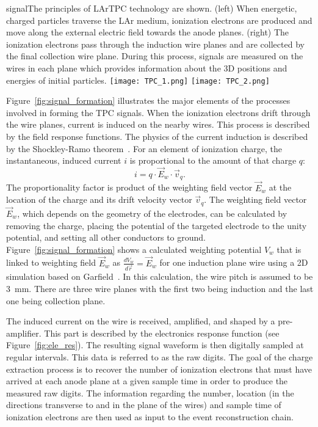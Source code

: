 \begin{cdrfigure}{signal}{The principles of LArTPC technology are shown. (left) When energetic, charged particles 
traverse the LAr medium, ionization electrons are produced and move
along the external electric field towards the anode planes. (right) The ionization
electrons pass through the induction wire planes and are  collected by the 
final collection wire plane. 
During this process, signals are measured on the wires
in each plane which provides information about the 3D positions and
energies of initial particles.}
\texttt{[image: TPC\_1.png]}
\texttt{[image: TPC\_2.png]}
\end{cdrfigure}


Figure~\ref{fig:signal_formation} illustrates the major elements of the processes 
involved in forming the TPC signals. When the ionization electrons drift through the 
wire planes, current is induced on the nearby wires. This process is described by the 
field response functions. The physics of the current induction is described by the 
Shockley-Ramo theorem~\cite{Shockley,Ramo}.  For an element of ionization charge, 
the instantaneous, induced current $i$ is proportional to the amount of that
charge $q$: 
\begin{equation}
i = q \cdot \vec{E}_{w} \cdot \vec{v}_q.
\end{equation}
The proportionality factor is product of the weighting field vector $\vec{E}_{w}$ 
at the location of the charge and its drift velocity vector $\vec{v}_q$. 
The weighting field vector $\vec{E}_{w}$, which depends on the geometry of the electrodes, 
can be calculated by removing the charge,  placing the potential of the targeted 
electrode to the unity potential, and setting all other conductors to ground. 
Figure~\ref{fig:signal_formation} shows a calculated weighting potential $V_{w}$ that 
is linked to weighting field $\vec{E}_{w}$ as $\frac{dV_{w}}{d\vec{r}} = \vec{E}_{w}$ for one 
induction plane wire using a 2D simulation based on Garfield~\cite{garfield}. 
In this calculation, the wire pitch is assumed to be 3~mm. There are three wire planes 
with the first two being induction and the last one being collection plane.  

The induced current on the wire is received, amplified, and shaped by
a pre-amplifier. This part is described by the electronics response
function (see Figure~\ref{fig:ele_res}).  
The resulting signal waveform is then digitally sampled at
regular intervals.  This data is referred to as the raw digits.  The
goal of the charge extraction process is to recover the number of
ionization electrons that must have arrived at each anode plane at a
given sample time in order to produce the measured raw digits.  The
information regarding the number, location (in the directions transverse
to and in the plane of the wires) and sample time of ionization
electrons are then used as input to the event reconstruction chain.

